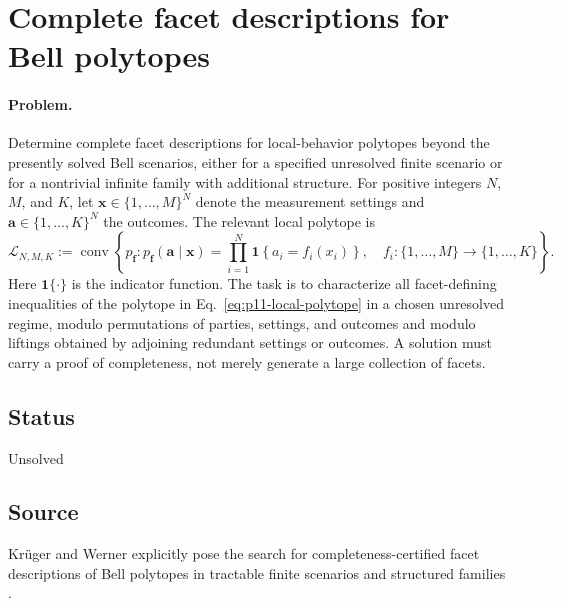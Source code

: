 \section{Complete facet descriptions for Bell polytopes}
\label{sec:op_ebee7d5c442d81a4}

\paragraph{Problem.}
Determine complete facet descriptions for local-behavior polytopes beyond the
presently solved Bell scenarios, either for a specified unresolved finite
scenario or for a nontrivial infinite family with additional structure.  For
positive integers $N$, $M$, and $K$, let
$\mathbf{x}\in\{1,\ldots,M\}^{N}$ denote the measurement settings and
$\mathbf{a}\in\{1,\ldots,K\}^{N}$ the outcomes.  The relevant local polytope
is
\begin{equation}
  \mathcal{L}_{N,M,K}
  :=\operatorname{conv}\!\left\{
    p_{\mathbf f}:p_{\mathbf f}(\mathbf a\mid\mathbf x)
    =\prod_{i=1}^{N}\mathbf{1}\!\left\{a_i=f_i(x_i)\right\},\quad
    f_i:\{1,\ldots,M\}\to\{1,\ldots,K\}
  \right\}.
  \label{eq:p11-local-polytope}
\end{equation}
Here $\mathbf 1\{\cdot\}$ is the indicator function.
The task is to characterize all facet-defining inequalities of the polytope
in Eq.~\eqref{eq:p11-local-polytope} in a chosen unresolved regime, modulo
permutations of parties, settings, and outcomes and modulo liftings obtained
by adjoining redundant settings or outcomes.  A solution must carry a proof
of completeness, not merely generate a large collection of facets.

\subsection*{Status}

Unsolved

\subsection*{Source}

Kr\"uger and Werner explicitly pose the search for completeness-certified
facet descriptions of Bell polytopes in tractable finite scenarios and
structured families .

